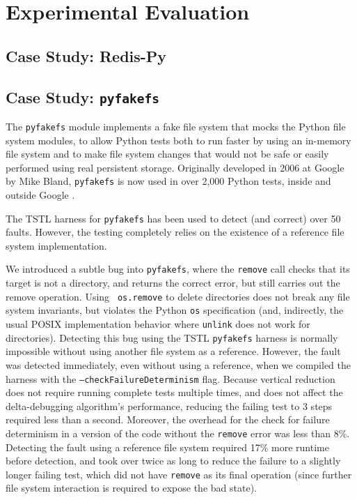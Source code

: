 \section{Experimental Evaluation}

\subsection {Case Study: Redis-Py}

\subsection {Case Study: {\tt pyfakefs}}

The {\tt pyfakefs} \cite{pyfakefs} module implements a fake file
system that mocks the Python file system modules, to allow Python
tests both to run faster by using an in-memory file system and to make
file system changes that would not be safe or easily performed using
real persistent storage.  Originally developed in 2006 at Google by
Mike Bland, {\tt pyfakefs} is now used in over 2,000 Python tests,
inside and outside Google \cite{pyfakefs}.

The TSTL harness for {\tt pyfakefs} has been used to detect (and
correct) over 50 faults.  However, the testing completely relies on
the existence of a reference file system implementation.

We introduced a subtle bug into {\tt pyfakefs}, where the {\tt remove}
call checks that its target is not a directory, and returns the
correct error, but still carries out the remove operation.  Using {\tt
  os.remove} to delete directories does not break any file system
invariants, but violates the Python {\tt os} specification (and,
indirectly, the usual POSIX implementation behavior where {\tt unlink}
does not work for directories).  Detecting this bug using the TSTL
{\tt pyfakefs} harness is normally impossible without using another
file system as a reference.  However, the fault was detected
immediately, even without using a reference, when we compiled the harness
with the {\tt --checkFailureDeterminism} flag.  Because vertical
reduction does not require running complete tests multiple times, and
does not affect the delta-debugging algorithm's performance, reducing
the failing test to 3 steps required less than a second.
Moreover, the overhead for the check for failure determinism in a
version of the code without the {\tt remove} error was
less than 8\%.  Detecting the fault using a reference file system 
required 17\% more runtime before detection, and took over twice as
long to reduce the failure to a
slightly longer failing test, which did not have {\tt remove} as its
final operation (since further file system interaction is required to
expose the bad state).

